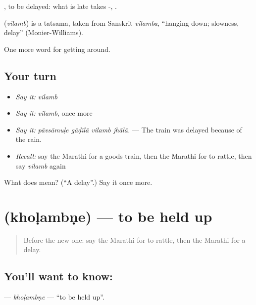  , to be delayed: what is late takes -,   .

\begin{cousinweb}
\textbf{} (\emph{vilamb}) is a tatsama, taken from Sanskrit \emph{vilamba}, \textquotedblleft{}hanging down; slowness, delay\textquotedblright{} (Monier-Williams).
\end{cousinweb}

\begin{grammarlens}[title={What you've built}]
One more word for getting around.
\end{grammarlens}

\subsection*{Your turn}
\begin{itemize}
\raggedright
  \item \emph{Say it:} \emph{vilamb}
  \item \emph{Say it:} \emph{vilamb}, once more
  \item \emph{Say it:} \emph{pāvsāmuḷe gāḍīlā vilamb jhālā.} — The train was delayed because of the rain.
  \item \emph{Recall:} say the Marathi for a goods train, then the Marathi for to rattle, then say \emph{vilamb} again
\end{itemize}

\begin{tcolorbox}[breakable,colback=teal!4,colframe=teal!35!black,title={Before you move on}]
What does  mean? (\textquotedblleft{}A delay\textquotedblright{}.) Say it once more.
\end{tcolorbox}
\section[\texorpdfstring{\mr{खोळंबणे} (khoḷambṇe)}{खोळंबणे (khoḷambṇe)}]{ (khoḷambṇe) — to be held up}

\label{lesson:MR-C397-kholambne}



\begin{quote}
Before the new one: say the Marathi for to rattle, then the Marathi for a delay.
\end{quote}

\subsection*{You'll want to know: }
\textbf{} — \emph{khoḷambṇe} — \textquotedblleft{}to be held up\textquotedblright{}.

